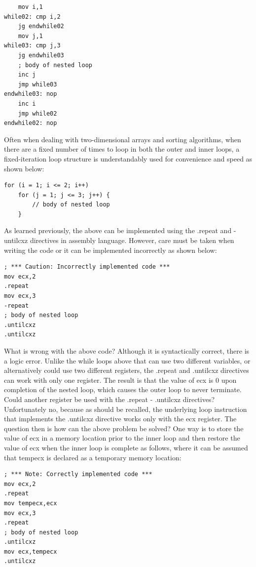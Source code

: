 \documentclass[10pt]{book}
\begin{document}
\begin{verbatim}
    mov i,1
while02: cmp i,2
    jg endwhile02
    mov j,1
while03: cmp j,3
    jg endwhile03
    ; body of nested loop
    inc j
    jmp while03
endwhile03: nop
    inc i
    jmp while02
endwhile02: nop
\end{verbatim}

Often when dealing with two-dimensional arrays and sorting algorithms, when there are a fixed number of times to loop in both the outer and inner loops, a fixed-iteration loop structure is understandably used for convenience and speed as shown below:


\begin{verbatim}
for (i = 1; i <= 2; i++)
    for (j = 1; j <= 3; j++) {
        // body of nested loop
    }
\end{verbatim}

As learned previously, the above can be implemented using the .repeat and -untilcxz directives in assembly language. However, care must be taken when writing the code or it can be implemented incorrectly as shown below:

\begin{verbatim}
; *** Caution: Incorrectly implemented code ***
mov ecx,2
.repeat
mov ecx,3
-repeat
; body of nested loop
.untilcxz
.untilcxz
\end{verbatim}

What is wrong with the above code? Although it is syntactically correct, there is a logic error. Unlike the while loops above that can use two different variables, or alternatively could use two different registers, the .repeat and .untilcxz directives can work with only one register. The result is that the value of ecx is 0 upon completion of the nested loop, which causes the outer loop to never terminate. Could another register be used with the .repeat - .untilcxz directives? Unfortunately no, because as should be recalled, the underlying loop instruction that implements the .untilcxz directive works only with the ecx register. The question then is how can the above problem be solved? One way is to store the\\
value of ecx in a memory location prior to the inner loop and then restore the value of ecx when the inner loop is complete as follows, where it can be assumed that tempecx is declared as a temporary memory location:


\begin{verbatim}
; *** Note: Correctly implemented code ***
mov ecx,2
.repeat
mov tempecx,ecx
mov ecx,3
.repeat
; body of nested loop
.untilcxz
mov ecx,tempecx
.untilcxz
\end{verbatim}
\end{document}
